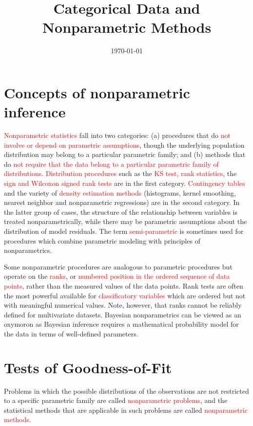 \documentclass[12pt,a4paper]{article}
\title{Categorical Data and Nonparametric Methods}
\author{}
\date{\today}
\begin{document}
\maketitle
\section{Concepts of nonparametric inference}
\textcolor{red}{Nonparametric statistics} fall into two categories: (a) procedures that do \textcolor{red}{not involve or depend on parametric assumptions}, though the underlying population distribution may belong to a particular parametric family; and (b) methods that do \textcolor{red}{not require that the data belong to a particular parametric family of distributions}. \textcolor{red}{Distribution procedures} such as the \textcolor{red}{KS test}, \textcolor{red}{rank statistics}, the \textcolor{red}{sign and Wilcoxon signed rank tests} are in the first category. \textcolor{red}{Contingency tables} and the variety of \textcolor{red}{density estimation methods} (histograms, kernel smoothing, nearest neighbor and nonparametric regressions) are in the second category. In the latter group of cases, the structure of the relationship between variables is treated nonparametrically, while there may be parametric assumptions about the distribution of model residuals. The term \textcolor{red}{semi-parametric} is sometimes used for procedures which combine parametric modeling with principles of nonparametrics.

Some nonparametric procedures are analogous to parametric procedures but operate on the \textcolor{red}{ranks}, or \textcolor{red}{numbered position in the ordered sequence of data points}, rather than the measured values of the data points. Rank tests are often the most powerful available for \textcolor{red}{classificatory variables} which are ordered but not with meaningful numerical values. Note, however, that ranks cannot be reliably defined for multivariate datasets. Bayesian nonparametrics can be viewed as an oxymoron as Bayesian inference requires a mathematical probability model for the data in terms of well-defined parameters.

\section{Tests of Goodness-of-Fit}
Problems in which the possible distributions of the observations are not restricted to a specific parametric family are called \textcolor{red}{nonparametric problems}, and the statistical methods that are applicable in such problems are called \textcolor{red}{nonparametric methods}.
\end{document}
